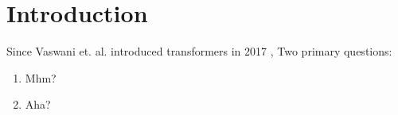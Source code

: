 \section{Introduction}
Since Vaswani et. al. introduced transformers in 2017 \cite{vaswani2017},
Two primary questions:
\begin{enumerate}
  \item Mhm?
  \item Aha?
\end{enumerate}

